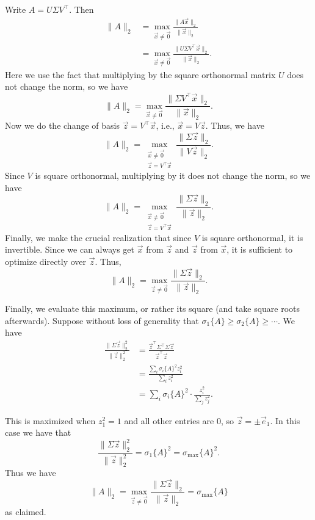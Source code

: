 \documentclass[10pt]{article}
\theoremstyle{definition}
\theoremstyle{plain}
\begin{document}
\begin{enumerate}[label=(\alph*)]
Write $A = U\Sigma V^\top$. Then
\begin{align}
\|A\|_2 &= \max_{\vec{x} \neq \vec{0}} \frac{\|A\vec{x}\|_2}{\|\vec{x}\|_2} \\
&= \max_{\vec{x} \neq \vec{0}} \frac{\|U\Sigma V^\top \vec{x}\|_2}{\|\vec{x}\|_2}.
\end{align}
Here we use the fact that multiplying by the square orthonormal matrix $U$ does not change the norm, so we have
\begin{equation}
\|A\|_2 = \max_{\vec{x} \neq \vec{0}} \frac{\|\Sigma V^\top \vec{x}\|_2}{\|\vec{x}\|_2}.
\end{equation}
Now we do the change of basis $\vec{z} = V^\top \vec{x}$, i.e., $\vec{x} = V\vec{z}$. Thus, we have
\begin{equation}
\|A\|_2 = \max_{\substack{\vec{x} \neq \vec{0} \\ \vec{z} = V^\top \vec{x}}} \frac{\|\Sigma \vec{z}\|_2}{\|V\vec{z}\|_2}.
\end{equation}
Since $V$ is square orthonormal, multiplying by it does not change the norm, so we have
\begin{equation}
\|A\|_2 = \max_{\substack{\vec{x} \neq \vec{0} \\ \vec{z} = V^\top \vec{x}}} \frac{\|\Sigma \vec{z}\|_2}{\|\vec{z}\|_2}.
\end{equation}
Finally, we make the crucial realization that since $V$ is square orthonormal, it is invertible. Since we can always get $\vec{x}$ from $\vec{z}$ and $\vec{z}$ from $\vec{x}$, it is sufficient to optimize directly over $\vec{z}$. Thus,
\begin{equation}
\|A\|_2 = \max_{\vec{z} \neq \vec{0}} \frac{\|\Sigma \vec{z}\|_2}{\|\vec{z}\|_2}.
\end{equation}

Finally, we evaluate this maximum, or rather its square (and take square roots afterwards). Suppose without loss of generality that $\sigma_1\{A\} \ge \sigma_2\{A\} \ge \cdots$. We have
\begin{align}
\frac{\|\Sigma \vec{z}\|_2^2}{\|\vec{z}\|_2^2} &= \frac{\vec{z}^\top \Sigma^\top \Sigma \vec{z}}{\vec{z}^\top \vec{z}} \\
&= \frac{\sum_i \sigma_i\{A\}^2 z_i^2}{\sum_i z_i^2} \\
&= \sum_i \sigma_i\{A\}^2 \cdot \frac{z_i^2}{\sum_j z_j^2}.
\end{align}

This is maximized when $z_1^2 = 1$ and all other entries are 0, so $\vec{z} = \pm \vec{e}_1$. In this case we have that
\begin{equation}
\frac{\|\Sigma \vec{z}\|_2^2}{\|\vec{z}\|_2^2} = \sigma_1\{A\}^2 = \sigma_{\max}\{A\}^2.
\end{equation}
Thus we have
\begin{equation}
\|A\|_2 = \max_{\vec{z} \neq \vec{0}} \frac{\|\Sigma \vec{z}\|_2}{\|\vec{z}\|_2} = \sigma_{\max}\{A\}
\end{equation}
as claimed.


\end{enumerate}
\end{document}
